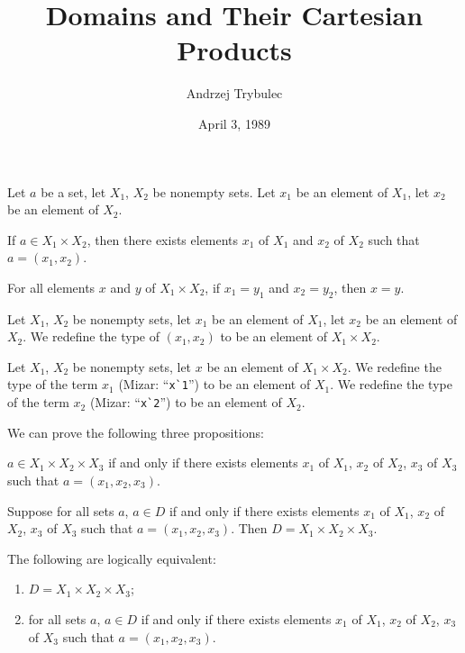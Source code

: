 \documentclass{article}
\title{Domains and Their Cartesian Products}
\author{Andrzej Trybulec}
\date{April 3, 1989}
\begin{document}
\maketitle

Let $a$ be a set, let $X_{1}$, $X_{2}$ be nonempty sets. Let $x_{1}$ be
an element of $X_{1}$, let $x_{2}$ be an element of $X_{2}$.
\begin{thm}
\item\label{domain1:1} If $a\in X_{1}\times X_{2}$, then there exists
  elements $x_{1}$ of $X_{1}$ and $x_{2}$ of $X_{2}$ such that $a=(x_{1},x_{2})$.
\item\label{domain1:2} For all elements $x$ and $y$ of $X_{1}\times X_{2}$,
  if $x_{1}=y_{1}$ and $x_{2}=y_{2}$, then $x=y$.
\end{thm}

\begin{definition}
Let $X_{1}$, $X_{2}$ be nonempty sets, let $x_{1}$ be an element of $X_{1}$,
let $x_{2}$ be an element of $X_{2}$.
We redefine the type of $(x_{1},x_{2})$ to be an element of $X_{1}\times X_{2}$.
\end{definition}

\begin{definition}
Let $X_{1}$, $X_{2}$ be nonempty sets, let $x$ be an element of
$X_{1}\times X_{2}$.
We redefine the type of the term $x_{1}$ (Mizar: ``\verb#x`1#'') to be
an element of $X_{1}$.
We redefine the type of the term $x_{2}$ (Mizar: ``\verb#x`2#'') to be
an element of $X_{2}$.
\end{definition}

We can prove the following three propositions:
\begin{thm}
\item\label{domain1:3} $a\in X_{1}\times X_{2}\times X_{3}$ if and only
  if there exists elements $x_{1}$ of $X_{1}$, $x_{2}$ of $X_{2}$,
  $x_{3}$ of $X_{3}$ such that $a=(x_{1},x_{2},x_{3})$.
\item\label{domain1:4} Suppose for all sets $a$, $a\in D$ if and only if
  there exists elements $x_{1}$ of $X_{1}$, $x_{2}$ of $X_{2}$,
  $x_{3}$ of $X_{3}$ such that $a=(x_{1},x_{2},x_{3})$.
  Then $D=X_{1}\times X_{2}\times X_{3}$.
\item\label{domain1:5} The following are logically equivalent:
  \begin{enumerate}[label=(\roman*)]
  \item $D=X_{1}\times X_{2}\times X_{3}$;
  \item for all sets $a$, $a\in D$ if and only if there exists elements $x_{1}$ of $X_{1}$, $x_{2}$ of $X_{2}$,
  $x_{3}$ of $X_{3}$ such that $a=(x_{1},x_{2},x_{3})$.
  \end{enumerate}
\end{thm}
\end{document}
